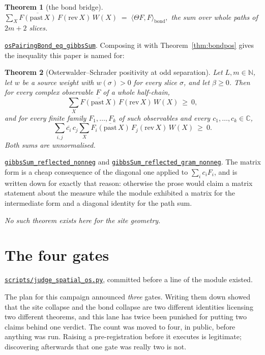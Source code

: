 \documentclass[11pt]{article}
\newtheorem{theorem}{Theorem}[section]
\theoremstyle{definition}
\newcommand{\anchor}{2d0346b2cc75d1cdf2e0ea0cefea4a8ef3be9c84}
\newcommand{\osline}[3]{%
  \href{https://github.com/lluiseriksson/THE-ERIKSSON-PROGRAMME/blob/\anchor/YangMills/OS/#1.lean\#L#2}{\nolinkurl{#3}}}
\newcommand{\repofile}[2]{%
  \href{https://github.com/lluiseriksson/THE-ERIKSSON-PROGRAMME/blob/\anchor/#1}{\nolinkurl{#2}}}
\newcommand{\C}{\mathbb{C}}
\begin{document}
\begin{theorem}[the bond bridge]\label{thm:bridge}
$\displaystyle
  \sum_{X}\overline{F(\mathrm{past}\,X)}\,F(\mathrm{rev}\,X)\,W(X)
   \;=\;\langle\Theta F,F\rangle_{\mathrm{bond}} ,$
the sum over whole paths of $2m+2$ slices.
\end{theorem}

\osline{SpatialOS}{746}{osPairingBond\_eq\_gibbsSum}.  Composing it with
Theorem~\ref{thm:bondpos} gives the inequality this paper is named for:

\begin{theorem}[Osterwalder--Schrader positivity at odd separation]\label{thm:os}
Let $L,m\in\mathbb{N}$, let $w$ be a source weight with $w(\sigma)>0$ for every
slice $\sigma$, and let $\beta\ge0$.  Then for every complex observable $F$ of a
whole half-chain,
\[
  \sum_{X}\overline{F(\mathrm{past}\,X)}\,F(\mathrm{rev}\,X)\,W(X)\ \ge\ 0 ,
\]
and for every finite family $F_1,\dots,F_k$ of such observables and every
$c_1,\dots,c_k\in\C$,
\[
  \sum_{i,j}\overline{c_i}\,c_j
    \sum_{X}\overline{F_i(\mathrm{past}\,X)}\,F_j(\mathrm{rev}\,X)\,W(X)
  \ \ge\ 0 .
\]
Both sums are unnormalised.
\end{theorem}

\osline{SpatialOS}{764}{gibbsSum\_reflected\_nonneg} and
\osline{SpatialOS}{778}{gibbsSum\_reflected\_gram\_nonneg}.  The matrix form is a
cheap consequence of the diagonal one applied to $\sum_i c_iF_i$, and is written
down for exactly that reason: otherwise the prose would claim a matrix statement
about the measure while the module exhibited a matrix for the intermediate form
and a diagonal identity for the path sum.

\emph{No such theorem exists here for the site geometry.}

\section{The four gates}\label{sec:gates}

\repofile{scripts/judge\_spatial\_os.py}{scripts/judge\_spatial\_os.py},
committed before a line of the module existed.

The plan for this campaign announced \emph{three} gates.  Writing them down
showed that the site collapse and the bond collapse are two different identities
licensing two different theorems, and this lane has twice been punished for
putting two claims behind one verdict.  The count was moved to four, in public,
before anything was run.  Raising a pre-registration before it executes is
legitimate; discovering afterwards that one gate was really two is not.
\end{document}
